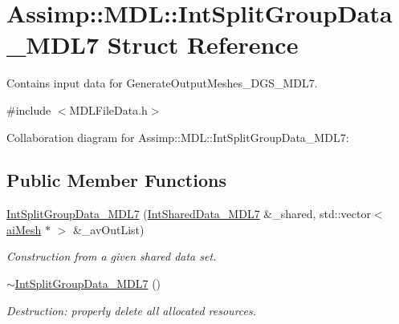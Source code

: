 \hypertarget{struct_assimp_1_1_m_d_l_1_1_int_split_group_data___m_d_l7}{\section{Assimp\+:\+:M\+D\+L\+:\+:Int\+Split\+Group\+Data\+\_\+\+M\+D\+L7 Struct Reference}
\label{struct_assimp_1_1_m_d_l_1_1_int_split_group_data___m_d_l7}
}


Contains input data for Generate\+Output\+Meshes\+\_\+D\+G\+S\+\_\+\+M\+D\+L7.  




{\ttfamily \#include $<$M\+D\+L\+File\+Data.\+h$>$}



Collaboration diagram for Assimp\+:\+:M\+D\+L\+:\+:Int\+Split\+Group\+Data\+\_\+\+M\+D\+L7\+:
\subsection*{Public Member Functions}
\begin{DoxyCompactItemize}
\item 
\hypertarget{struct_assimp_1_1_m_d_l_1_1_int_split_group_data___m_d_l7_a580242769b735bcb51b8099dad50a306}{\hyperlink{struct_assimp_1_1_m_d_l_1_1_int_split_group_data___m_d_l7_a580242769b735bcb51b8099dad50a306}{Int\+Split\+Group\+Data\+\_\+\+M\+D\+L7} (\hyperlink{struct_assimp_1_1_m_d_l_1_1_int_shared_data___m_d_l7}{Int\+Shared\+Data\+\_\+\+M\+D\+L7} \&\+\_\+shared, std\+::vector$<$ \hyperlink{structai_mesh}{ai\+Mesh} $\ast$ $>$ \&\+\_\+av\+Out\+List)}\label{struct_assimp_1_1_m_d_l_1_1_int_split_group_data___m_d_l7_a580242769b735bcb51b8099dad50a306}

\begin{DoxyCompactList}\small\item\em Construction from a given shared data set. \end{DoxyCompactList}\item 
\hypertarget{struct_assimp_1_1_m_d_l_1_1_int_split_group_data___m_d_l7_a8d8dff8f040e9067a4c32593ff4bb45c}{\hyperlink{struct_assimp_1_1_m_d_l_1_1_int_split_group_data___m_d_l7_a8d8dff8f040e9067a4c32593ff4bb45c}{$\sim$\+Int\+Split\+Group\+Data\+\_\+\+M\+D\+L7} ()}\label{struct_assimp_1_1_m_d_l_1_1_int_split_group_data___m_d_l7_a8d8dff8f040e9067a4c32593ff4bb45c}

\begin{DoxyCompactList}\small\item\em Destruction\+: properly delete all allocated resources. \end{DoxyCompactList}\end{DoxyCompactItemize}
